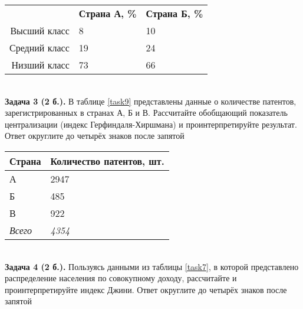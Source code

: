 \documentclass{article}
\begin{document}
\begin{minipage}{\textwidth}
\centering
\begin{tabularx}{0.7\textwidth}{rYY}
\toprule
 & \textbf{Страна А, \%} & \textbf{Страна Б, \%} \\
\cmidrule(lr){2-2}\cmidrule(lr){3-3}
Высший класс & 8 & 10 \\

Средний класс & 19 & 24 \\

Низший класс & 73 & 66 \\
\bottomrule
\end{tabularx}
\label{task6}
\end{minipage} \\[35pt]

\textbf{Задача 3 (2 б.).} В таблице \ref{task9} представлены данные о количестве патентов, зарегистрированных в странах А, Б и В. Рассчитайте обобщающий показатель централизации (индекс Герфиндаля-Хиршмана) и проинтерпретируйте результат. Ответ округлите до четырёх знаков после запятой\\

\begin{minipage}{\textwidth}
\centering
\begin{tabularx}{0.4\textwidth}{YY}
\toprule
\textbf{Страна} & \textbf{Количество патентов, шт.} \\
\midrule
А & 2947 \\

Б & 485 \\

В & 922 \\
\addlinespace
\textit{Всего} & \textit{4354} \\
\bottomrule
\end{tabularx}
\label{task9}
\end{minipage} \\[35pt]

\textbf{Задача 4 (2 б.).} Пользуясь данными из таблицы \ref{task7}, в которой представлено распределение населения по совокупному доходу, рассчитайте и проинтерпретируйте индекс Джини. Ответ округлите до четырёх знаков после запятой\\
\end{document}
